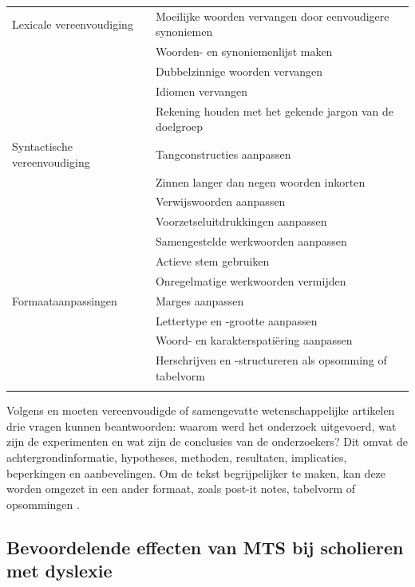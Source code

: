 \begin{center}
	\begin{tabular}{ | m{2cm} | m{12cm} | } 
		\hline
		Lexicale vereenvoudiging & Moeilijke woorden vervangen door eenvoudigere synoniemen \\ 
			& Woorden- en synoniemenlijst maken \\
			& Dubbelzinnige woorden vervangen \\
			& Idiomen vervangen \\ 
			& Rekening houden met het gekende jargon van de doelgroep \\
		\hline
		Syntactische vereenvoudiging & Tangconstructies aanpassen \\
		& Zinnen langer dan negen woorden inkorten \\
		& Verwijswoorden aanpassen \\
		& Voorzetseluitdrukkingen aanpassen \\
		& Samengestelde werkwoorden aanpassen \\
		& Actieve stem gebruiken \\
		& Onregelmatige werkwoorden vermijden \\
		\hline
		Formaataanpassingen & Marges aanpassen \\
		& Lettertype en -grootte aanpassen \\
		& Woord- en karakterspatiëring aanpassen \\
		& Herschrijven en -structureren als opsomming of tabelvorm \\
		& \\
		\hline
	\end{tabular}
	\label{table:manual-simplification}
\end{center}

\medspace

Volgens \textcite{Hollenkamp2020} en \textcite{McCombes2022} moeten vereenvoudigde of samengevatte wetenschappelijke artikelen drie vragen kunnen beantwoorden: waarom werd het onderzoek uitgevoerd, wat zijn de experimenten en wat zijn de conclusies van de onderzoekers? Dit omvat de achtergrondinformatie, hypotheses, methoden, resultaten, implicaties, beperkingen en aanbevelingen. Om de tekst begrijpelijker te maken, kan deze worden omgezet in een ander formaat, zoals post-it notes, tabelvorm of opsommingen \autocite{Rijkhoff2022}. 

\subsection{Bevoordelende effecten van MTS bij scholieren met dyslexie}


